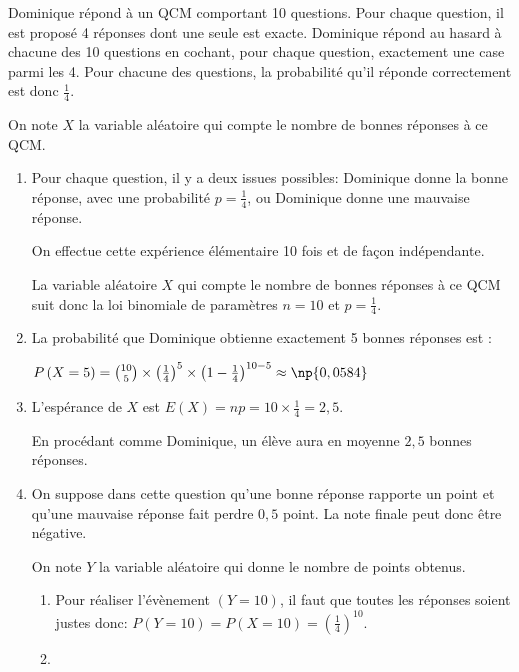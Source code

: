 Dominique répond à un QCM comportant 10 questions.
Pour chaque question, il est proposé 4 réponses dont une seule est exacte.
Dominique répond au hasard à chacune des 10 questions en cochant, pour chaque question, exactement une case parmi les 4.
Pour chacune des questions, la probabilité qu'il réponde correctement est donc $\frac{1}{4}$.

On note $X$ la variable aléatoire qui compte le nombre de bonnes réponses à ce QCM.

\begin{enumerate}
\item 
Pour chaque question, il y a deux issues possibles: Dominique donne la bonne réponse, avec une probabilité $p=\frac{1}{4}$, ou Dominique donne une mauvaise réponse.

On effectue cette expérience élémentaire 10 fois et de façon indépendante.

La variable aléatoire $X$ qui compte le nombre de bonnes réponses à ce QCM suit donc la loi binomiale de paramètres $n=10$ et $p=\frac{1}{4}$.

\item 
La probabilité que Dominique obtienne exactement 5 bonnes réponses est :

$P\left (X=5\right ) = \binom{10}{5} \times \left (\frac{1}{4}\right )^5 \times \left (1-\frac{1}{4}\right )^{10-5}\approx \np{0,0584}$

\item 
L'espérance de $X$ est $E(X)=np = 10\times \frac{1}{4}= 2,5$.

En procédant comme Dominique, un élève aura en moyenne $2,5$ bonnes réponses.

\item On suppose dans cette question qu'une bonne réponse rapporte un point et qu'une mauvaise réponse fait perdre $0,5$ point. La note finale peut donc être négative.

On note $Y$ la variable aléatoire qui donne le nombre de points obtenus.

	\begin{enumerate}
		\item 
Pour réaliser l'évènement $(Y=10)$, il faut que toutes les réponses soient justes donc:
$P\left (Y = 10\right )=P\left (X = 10\right ) = \left (\frac{1}{4}\right )^{10}$.		
				
		\item 
{}


\end{enumerate}
\end{enumerate}
